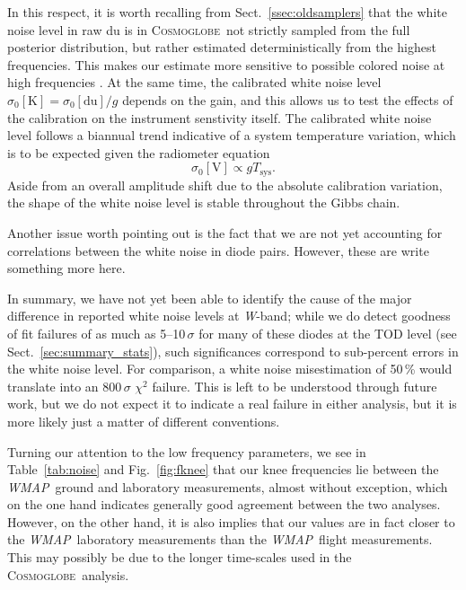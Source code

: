 \documentclass[twocolumn]{../../common/aa}
\def\WMAP{\emph{WMAP}}
\newcommand{\cosmoglobe}{\textsc{Cosmoglobe}}
\newcommand{\W}[0]{\textit W}
\begin{document}
In this respect, it is worth recalling from Sect.~\ref{ssec:oldsamplers} that the white noise level in raw du is in \cosmoglobe\ not strictly sampled from the full posterior distribution, but rather estimated deterministically from the highest frequencies. This makes our estimate more sensitive to possible colored noise at high frequencies \citep{bp17}. At the same time, the calibrated white noise level $\sigma_0[\mathrm K]=\sigma_0[\mathrm{du}]/g$ depends on the gain, and this  allows us to test the effects of the calibration on the instrument senstivity itself. The calibrated white noise level follows a biannual trend indicative of a system temperature variation, which is to be expected given the radiometer equation
\begin{equation}
	\sigma_0[\mathrm V]\propto gT_\mathrm{sys}.
\end{equation}
Aside from an overall amplitude shift due to the absolute calibration variation, the shape of the white noise level is stable throughout the Gibbs chain.

Another issue worth pointing out is the fact that we are not yet accounting for correlations between the white noise in diode pairs. However, these are {\color{red} write something more here.}

In summary, we have not yet been able to identify the cause of the major difference in reported white noise levels at \W-band; while we do detect goodness of fit failures of as much as 5--10\,$\sigma$ for many of these diodes at the TOD level (see Sect.~\ref{sec:summary_stats}), such significances correspond to sub-percent errors in the white noise level. For comparison, a white noise misestimation of 50\,\% would translate into an 800\,$\sigma$ $\chi^2$ failure. This is left to be understood through future work, but we do not expect it to indicate a real failure in either analysis, but it is more likely just a matter of different conventions.

Turning our attention to the low frequency parameters, we see in Table~\ref{tab:noise} and Fig.~\ref{fig:fknee} that our knee frequencies lie between the \WMAP\ ground and laboratory measurements, almost without exception, which on the one hand indicates generally good agreement between the two analyses. However, on the other hand, it is also implies that our values are in fact closer to the \WMAP\ laboratory measurements than the \WMAP\ flight measurements. This may possibly be due to the longer time-scales used in the \cosmoglobe\ analysis.
\end{document}

